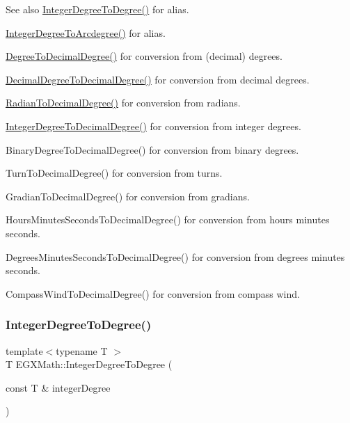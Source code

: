 \begin{DoxySeeAlso}{See also}
\mbox{\hyperlink{group___e_g_x_math-_angle_conversions-_integer_degree_gaa9b63c6095fd7f8809fcfa2ba1e62235}{Integer\+Degree\+To\+Degree()}} for alias. 

\mbox{\hyperlink{group___e_g_x_math-_angle_conversions-_integer_degree_gaf633d0b82bfb7586ce86ffbcf78d8f7a}{Integer\+Degree\+To\+Arcdegree()}} for alias. 

\mbox{\hyperlink{group___e_g_x_math-_angle_conversions-_degree_ga568afc1d436d425bf5d4edea584aee08}{Degree\+To\+Decimal\+Degree()}} for conversion from (decimal) degrees. 

\mbox{\hyperlink{group___e_g_x_math-_angle_conversions-_decimal_degree_gafccf9cd779903872887978ab9d79661f}{Decimal\+Degree\+To\+Decimal\+Degree()}} for conversion from decimal degrees. 

\mbox{\hyperlink{group___e_g_x_math-_angle_conversions-_radian_ga6d170f1882c32de53167c04524d05f67}{Radian\+To\+Decimal\+Degree()}} for conversion from radians. 

\mbox{\hyperlink{group___e_g_x_math-_angle_conversions-_integer_degree_gac219c3198508ba984d8d81d22831b27d}{Integer\+Degree\+To\+Decimal\+Degree()}} for conversion from integer degrees. 

Binary\+Degree\+To\+Decimal\+Degree() for conversion from binary degrees. 

Turn\+To\+Decimal\+Degree() for conversion from turns. 

Gradian\+To\+Decimal\+Degree() for conversion from gradians. 

Hours\+Minutes\+Seconds\+To\+Decimal\+Degree() for conversion from hours minutes seconds. 

Degrees\+Minutes\+Seconds\+To\+Decimal\+Degree() for conversion from degrees minutes seconds. 

Compass\+Wind\+To\+Decimal\+Degree() for conversion from compass wind. 
\end{DoxySeeAlso}
\mbox{\label{group___e_g_x_math-_angle_conversions-_integer_degree_gaa9b63c6095fd7f8809fcfa2ba1e62235}} 
\subsubsection{\texorpdfstring{Integer\+Degree\+To\+Degree()}{IntegerDegreeToDegree()}}
{\footnotesize\ttfamily template$<$typename T $>$ \\
T E\+G\+X\+Math\+::\+Integer\+Degree\+To\+Degree (\begin{DoxyParamCaption}\item[{const T \&}]{integer\+Degree }\end{DoxyParamCaption})}



